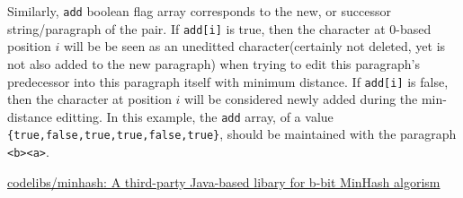\documentclass{article}
\begin{document}
\begin{enumerate}
\begin{itemize}
\begin{itemize}
      Similarly, \texttt{add} boolean flag array corresponds to the new, or successor string/paragraph of the pair. If \texttt{add[i]} is true, then the character at 0-based position $i$ will be be seen as an uneditted character(certainly not deleted, yet is not also added to the new paragraph) when trying to edit this paragraph's predecessor into this paragraph itself with minimum distance. If \texttt{add[i]} is false, then the character at position $i$ will be considered newly added during the min-distance editting. In this example, the \texttt{add} array, of a value \texttt{\{true,false,true,true,false,true\}}, should be maintained with the paragraph \texttt{<b><a>}.
    \end{itemize}
  \end{itemize}
\end{enumerate}

















\begin{thebibliography}{9}
      \href{https://github.com/codelibs/minhash}{codelibs/minhash: A third-party Java-based libary  for b-bit MinHash algorism}


\end{thebibliography} %
\end{document}
